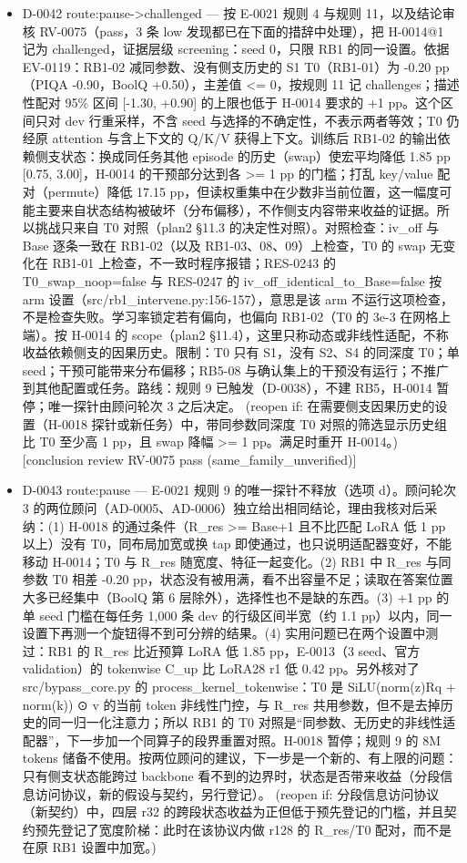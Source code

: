 \documentclass[11pt]{article}
\begin{document}
\begin{itemize}
\item D-0042 route:pause-\textgreater{}challenged --- 按 E-0021 规则 4 与规则 11，以及结论审核 RV-0075（pass，3 条 low 发现都已在下面的措辞中处理），把 H-0014@1 记为 challenged，证据层级 screening：seed 0，只限 RB1 的同一设置。依据 EV-0119：RB1-02 减同参数、没有侧支历史的 S1 T0（RB1-01）为 -0.20 pp（PIQA -0.90，BoolQ +0.50），主差值 \textless{}= 0，按规则 11 记 challenges；描述性配对 95\% 区间 [-1.30, +0.90] 的上限也低于 H-0014 要求的 +1 pp。这个区间只对 dev 行重采样，不含 seed 与选择的不确定性，不表示两者等效；T0 仍经原 attention 与含上下文的 Q/K/V 获得上下文。训练后 RB1-02 的输出依赖侧支状态：换成同任务其他 episode 的历史（swap）使宏平均降低 1.85 pp [0.75, 3.00]，H-0014 的干预部分达到各 \textgreater{}= 1 pp 的门槛；打乱 key/value 配对（permute）降低 17.15 pp，但读权重集中在少数非当前位置，这一幅度可能主要来自状态结构被破坏（分布偏移），不作侧支内容带来收益的证据。所以挑战只来自 T0 对照（plan2 §11.3 的决定性对照）。对照检查：iv\_off 与 Base 逐条一致在 RB1-02（以及 RB1-03、08、09）上检查，T0 的 swap 无变化在 RB1-01 上检查，不一致时程序报错；RES-0243 的 T0\_swap\_noop=false 与 RES-0247 的 iv\_off\_identical\_to\_Base=false 按 arm 设置（src/rb1\_intervene.py:156-157），意思是该 arm 不运行这项检查，不是检查失败。学习率锁定若有偏向，也偏向 RB1-02（T0 的 3e-3 在网格上端）。按 H-0014 的 scope（plan2 §11.4），这里只称动态或非线性适配，不称收益依赖侧支的因果历史。限制：T0 只有 S1，没有 S2、S4 的同深度 T0；单 seed；干预可能带来分布偏移；RB5-08 与确认集上的干预没有运行；不推广到其他配置或任务。路线：规则 9 已触发（D-0038），不建 RB5，H-0014 暂停；唯一探针由顾问轮次 3 之后决定。 (reopen if: 在需要侧支因果历史的设置（H-0018 探针或新任务）中，带同参数同深度 T0 对照的筛选显示历史组比 T0 至少高 1 pp，且 swap 降幅 \textgreater{}= 1 pp。满足时重开 H-0014。) [conclusion review RV-0075 pass (same\_family\_unverified)]
\item D-0043 route:pause --- E-0021 规则 9 的唯一探针不释放（选项 d）。顾问轮次 3 的两位顾问（AD-0005、AD-0006）独立给出相同结论，理由我核对后采纳：(1) H-0018 的通过条件（R\_res \textgreater{}= Base+1 且不比匹配 LoRA 低 1 pp 以上）没有 T0，同布局加宽或换 tap 即使通过，也只说明适配器变好，不能移动 H-0014；T0 与 R\_res 随宽度、特征一起变化。(2) RB1 中 R\_res 与同参数 T0 相差 -0.20 pp，状态没有被用满，看不出容量不足；读取在答案位置大多已经集中（BoolQ 第 6 层除外），选择性也不是缺的东西。(3) +1 pp 的单 seed 门槛在每任务 1,000 条 dev 的行级区间半宽（约 1.1 pp）以内，同一设置下再测一个旋钮得不到可分辨的结果。(4) 实用问题已在两个设置中测过：RB1 的 R\_res 比近预算 LoRA 低 1.85 pp，E-0013（3 seed、官方 validation）的 tokenwise C\_up 比 LoRA28 r1 低 0.42 pp。另外核对了 src/bypass\_core.py 的 process\_kernel\_tokenwise：T0 是 SiLU(norm(z)Rq + norm(k)) ⊙ v 的当前 token 非线性门控，与 R\_res 共用参数，但不是去掉历史的同一归一化注意力；所以 RB1 的 T0 对照是``同参数、无历史的非线性适配器''，下一步加一个同算子的段界重置对照。H-0018 暂停；规则 9 的 8M tokens 储备不使用。按两位顾问的建议，下一步是一个新的、有上限的问题：只有侧支状态能跨过 backbone 看不到的边界时，状态是否带来收益（分段信息访问协议，新的假设与契约，另行登记）。 (reopen if: 分段信息访问协议（新契约）中，四层 r32 的跨段状态收益为正但低于预先登记的门槛，并且契约预先登记了宽度阶梯：此时在该协议内做 r128 的 R\_res/T0 配对，而不是在原 RB1 设置中加宽。)

\end{itemize}
\end{document}
